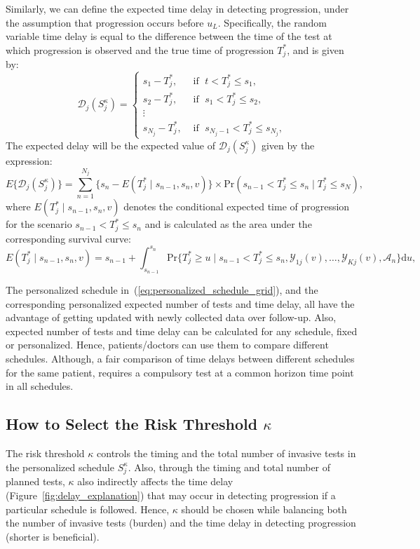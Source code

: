 Similarly, we can define the expected time delay in detecting progression, under the assumption that progression occurs before $u_L$. Specifically, the random variable time delay is equal to the difference between the time of the test at which progression is observed and the true time of progression $T_j^*$, and is given by:
\[
\mathcal D_j (S^\kappa_j) = \left \{
\begin{array}{ll}
s_1 - T_j^*, & \mbox{ if } \; t < T^*_j \leq s_1,\\
s_2 - T_j^*, & \mbox{ if } \; s_1 < T^*_j \leq s_2,\\
\vdots&\\
s_{N_j} - T_j^*, & \mbox{ if } \; s_{N_j-1} < T^*_j \leq s_{N_j},
\end{array}
\right.
\]
The expected delay will be the expected value of $\mathcal D_j (S^\kappa_j)$ given by the expression:
\begin{equation*}
\label{eq:exp_delay}
E \big \{ \mathcal D_j(S^\kappa_j)\big\} = \sum_{n = 1}^{N_j} \Big\{s_n - E(T^*_j \mid s_{n-1}, s_n, v)\Big\} \times \mbox{Pr}(s_{n-1} < T^*_j \leq s_n\mid T^*_j \leq s_N),
\end{equation*}
where $E(T^*_j \mid s_{n-1}, s_n, v)$ denotes the conditional expected time of progression for the scenario $s_{n-1} < T^*_j \leq s_n$ and is calculated as the area under the corresponding survival curve:
\begin{equation*}
E(T^*_j \mid s_{n-1}, s_n, v) = s_{n-1} + \int_{s_{n-1}}^{s_n} \mbox{Pr}\Big\{T^*_j \geq u \mid s_{n-1} < T^*_j \leq s_n, \mathcal{Y}_{1j}(v), \ldots, \mathcal{Y}_{Kj}(v), \mathcal{A}_n\Big\} \mathrm{d}u,
\end{equation*}

The personalized schedule in~(\ref{eq:personalized_schedule_grid}), and the corresponding personalized expected number of tests and time delay, all have the advantage of getting updated with newly collected data over follow-up. Also, expected number of tests and time delay can be calculated for any schedule, fixed or personalized. Hence, patients/doctors can use them to compare different schedules. Although, a fair comparison of time delays between different schedules for the same patient, requires a compulsory test at a common horizon time point in all schedules.

\subsection{How to Select the Risk Threshold $\kappa$}
The risk threshold $\kappa$ controls the timing and the total number of invasive tests in the personalized schedule $S^\kappa_j$. Also, through the timing and total number of planned tests, $\kappa$ also indirectly affects the time delay (Figure~\ref{fig:delay_explanation}) that may occur in detecting progression if a particular schedule is followed. Hence, $\kappa$ should be chosen while balancing both the number of invasive tests (burden) and the time delay in detecting progression (shorter is beneficial).


